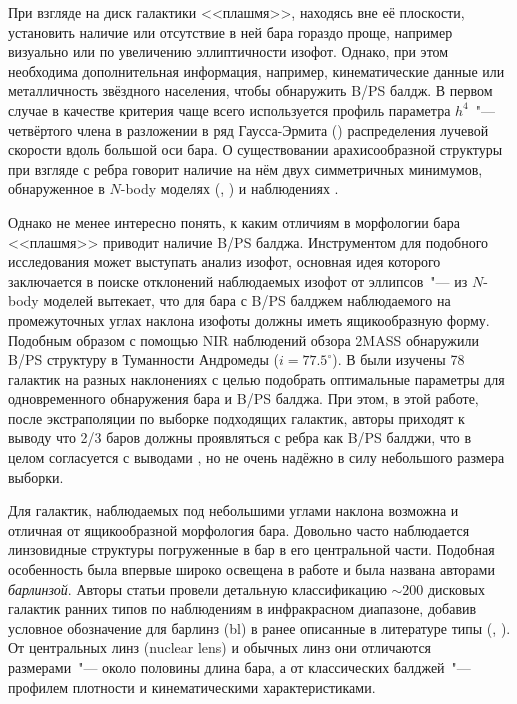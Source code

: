 \documentclass{trlnotes}
\begin{document}
При взгляде на диск галактики <<плашмя>>, находясь вне её плоскости, установить наличие
или отсутствие в ней бара гораздо проще, например визуально или по увеличению эллиптичности изофот. Однако, при
этом необходима дополнительная информация, например, кинематические данные или металличность звёздного населения,
чтобы обнаружить B/PS балдж. В первом случае в качестве критерия чаще всего используется профиль параметра
$h^4$~"---  четвёртого члена в разложении в ряд Гаусса-Эрмита (\cite{vandermarel1993}) распределения лучевой
скорости вдоль большой оси бара. О существовании арахисообразной структуры при взгляде с ребра говорит наличие на
нём двух симметричных минимумов, обнаруженное в $N$-body моделях (\cite{debattista2005}, \cite{iannuzzi2015}) и наблюдениях \citep{mendez-abreu2008}.

Однако не менее интересно понять, к каким отличиям в морфологии бара <<плашмя>> приводит наличие B/PS балджа. 
Инструментом для подобного исследования может выступать анализ изофот, основная идея которого заключается в поиске
отклонений наблюдаемых изофот от эллипсов~"--- из $N$-body моделей вытекает, что для бара с B/PS балджем
наблюдаемого на промежуточных углах наклона изофоты должны иметь ящикообразную форму. Подобным образом с помощью NIR наблюдений обзора 2MASS  \cite{beaton2007} обнаружили B/PS структуру в Туманности Андромеды ($i = 77.5^\circ$). 
В \cite{erwin2013} были изучены 78 галактик на разных наклонениях с целью подобрать оптимальные параметры для
одновременного обнаружения бара и B/PS балджа. При этом, в этой работе, после экстраполяции по выборке
подходящих галактик, авторы приходят к выводу что 2/3 баров должны проявляться с ребра как B/PS балджи, что в
целом согласуется с выводами \cite{lutticke2000a}, но не очень надёжно в силу небольшого размера выборки.

Для галактик, наблюдаемых под небольшими углами наклона возможна и отличная от ящикообразной морфология бара.
Довольно часто наблюдается линзовидные структуры погруженные в бар в его центральной части. Подобная особенность
была впервые широко освещена в работе \cite{laurikainen2011} и была названа авторами \emph{барлинзой}.
Авторы статьи провели детальную классификацию $\sim\!200$ дисковых галактик ранних типов по наблюдениям в
инфракрасном диапазоне, добавив условное обозначение для барлинз (bl) в ранее описанные в литературе типы
(\cite{devaucouleurs1959}, \cite{buta2010}). От центральных линз (nuclear lens) и обычных линз они отличаются
размерами~"--- около половины длина бара, а от классических балджей~"--- профилем плотности и кинематическими
характеристиками. 
\end{document}
